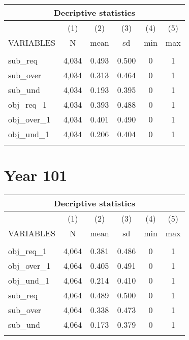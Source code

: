 \documentclass[A4]{article}
\begin{document}
\begin{tabular}{lccccc}
\multicolumn{6}{c}{Decriptive statistics} \\ \hline
 & (1) & (2) & (3) & (4) & (5) \\
VARIABLES & N & mean & sd & min & max \\ \hline
 &  &  &  &  &  \\
sub\_req & 4,034 & 0.493 & 0.500 & 0 & 1 \\
sub\_over & 4,034 & 0.313 & 0.464 & 0 & 1 \\
sub\_und & 4,034 & 0.193 & 0.395 & 0 & 1 \\
obj\_req\_1 & 4,034 & 0.393 & 0.488 & 0 & 1 \\
obj\_over\_1 & 4,034 & 0.401 & 0.490 & 0 & 1 \\
obj\_und\_1 & 4,034 & 0.206 & 0.404 & 0 & 1 \\
 &  &  &  &  &  \\ \hline
\end{tabular}



\section*{Year 101}
\begin{tabular}{lccccc}
\multicolumn{6}{c}{Decriptive statistics} \\ \hline
 & (1) & (2) & (3) & (4) & (5) \\
VARIABLES & N & mean & sd & min & max \\ \hline
 &  &  &  &  &  \\
obj\_req\_1 & 4,064 & 0.381 & 0.486 & 0 & 1 \\
obj\_over\_1 & 4,064 & 0.405 & 0.491 & 0 & 1 \\
obj\_und\_1 & 4,064 & 0.214 & 0.410 & 0 & 1 \\
sub\_req & 4,064 & 0.489 & 0.500 & 0 & 1 \\
sub\_over & 4,064 & 0.338 & 0.473 & 0 & 1 \\
sub\_und & 4,064 & 0.173 & 0.379 & 0 & 1 \\
 &  &  &  &  &  \\ \hline
\end{tabular}
\end{document}

